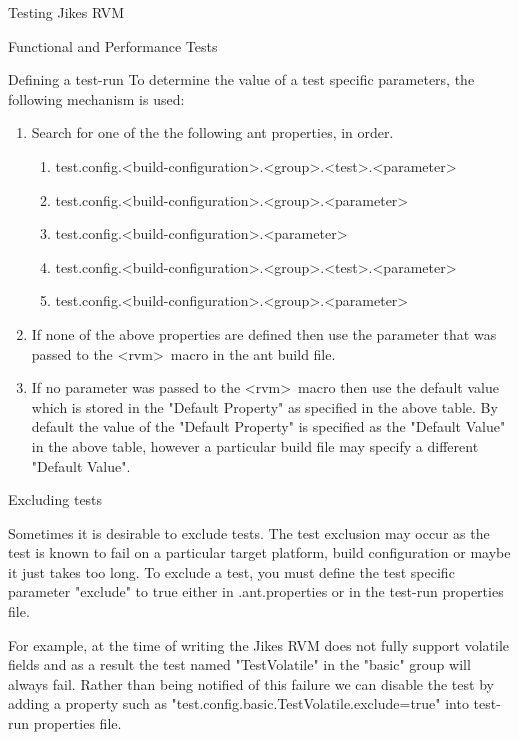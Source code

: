 \begin{chapter}{Testing Jikes RVM}
\begin{section}{Functional and Performance Tests}
\begin{subsection}{Defining a test-run}
To determine the value of a test specific parameters, the following mechanism is used:

\begin{enumerate}
  \item    Search for one of the the following ant properties, in order.
    \begin{enumerate}
        \item test.config.\textless build-configuration\textgreater .\textless group\textgreater .\textless test\textgreater .\textless parameter\textgreater 
        \item test.config.\textless build-configuration\textgreater .\textless group\textgreater .\textless parameter\textgreater 
        \item test.config.\textless build-configuration\textgreater .\textless parameter\textgreater 
        \item test.config.\textless build-configuration\textgreater .\textless group\textgreater .\textless test\textgreater .\textless parameter\textgreater 
        \item test.config.\textless build-configuration\textgreater .\textless group\textgreater .\textless parameter\textgreater 
    \end{enumerate}
  \item If none of the above properties are defined then use the parameter that was passed to the \textless rvm\textgreater\ macro in the ant build file.
  \item If no parameter was passed to the \textless rvm\textgreater\ macro then use the default value which is stored in the "Default Property" as specified in the above table. By default the value of the "Default Property" is specified as the "Default Value" in the above table, however a particular build file may specify a different "Default Value".
\end{enumerate}

\end{subsection}

\begin{subsection}{Excluding tests}

Sometimes it is desirable to exclude tests. The test exclusion may occur as the test is known to fail on a particular target platform, build configuration or maybe it just takes too long. To exclude a test, you must define the test specific parameter "exclude" to true either in .ant.properties or in the test-run properties file.

For example, at the time of writing the Jikes RVM does not fully support volatile fields and as a result the test named "TestVolatile" in the "basic" group will always fail. Rather than being notified of this failure we can disable the test by adding a property such as "test.config.basic.TestVolatile.exclude=true" into test-run properties file.


\end{subsection}
\end{section}
\end{chapter}
